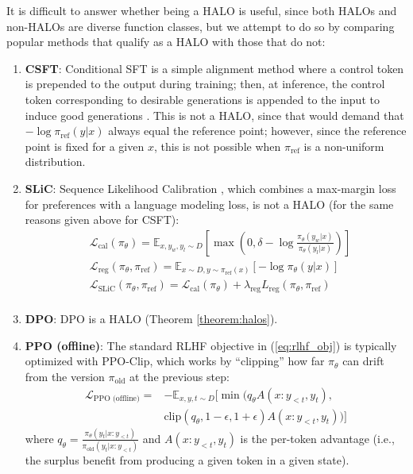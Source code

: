 It is difficult to answer whether being a HALO is useful, since both HALOs and non-HALOs are diverse function classes, but we attempt to do so by comparing popular methods that qualify as a HALO with those that do not:
\begin{enumerate}
    \item \textbf{CSFT}: Conditional SFT is a simple alignment method where a control token is prepended to the output during training; then, at inference, the control token corresponding to desirable generations is appended to the input to induce good generations \citep{korbak2023pretraining}.
    This is not a HALO, since that would demand that $- \log \pi_\text{ref}(y|x)$ always equal the reference point; however, since the reference point is fixed for a given $x$, this is not possible when $\pi_\text{ref}$ is a non-uniform distribution.

    \item \textbf{SLiC}: Sequence Likelihood Calibration \citep{zhao2023slic}, which combines a max-margin loss for preferences with a language modeling loss, is not a HALO (for the same reasons given above for CSFT):
    \begin{equation*}
    \begin{split} 
        & \mathcal{L}_\text{cal}(\pi_\theta) = \mathbb{E}_{x,y_w,y_l \sim D}\left[ \max \left( 0, \delta - \log \frac{\pi_\theta(y_w|x)}{\pi_\theta(y_l|x)} \right) \right] \\
        & \mathcal{L}_\text{reg}(\pi_\theta, \pi_{\text{ref}}) = \mathbb{E}_{x \sim D, y \sim \pi_\text{ref}(x)}[- \log \pi_\theta(y|x)] \\
        & \mathcal{L}_\text{SLiC}(\pi_\theta, \pi_{\text{ref}}) = \mathcal{L}_\text{cal}(\pi_\theta) + \lambda_\text{reg} L_\text{reg}(\pi_\theta, \pi_{\text{ref}}) \\
    \end{split}
    \end{equation*}

    \item \textbf{DPO}: DPO is a HALO (Theorem \ref{theorem:halos}).

    \item \textbf{PPO (offline)}: The standard RLHF objective in (\ref{eq:rlhf_obj}) is typically optimized with PPO-Clip, which works by “clipping” how far $\pi_\theta$ can drift from the version $\pi_\text{old}$ at the previous step:
    \begin{equation*}
    \begin{split}
        \mathcal{L}_\text{PPO (offline)} =& -\mathbb{E}_{x,y,t \sim D}[\min(q_\theta A(x{:}y_{<t}, y_t), \\
        &\text{clip}(q_\theta, 1 - \epsilon, 1 + \epsilon) A(x{:}y_{<t}, y_t))]
    \end{split}
    \end{equation*}
    where $q_\theta = \frac{\pi_\theta (y_t|x{:}y_{<t})}{\pi_\text{old}(y_t|x{:}y_{<t})}$ and $A(x{:}y_{<t}, y_t)$ is the per-token advantage (i.e., the surplus benefit from producing a given token in a given state).
    

\end{enumerate}
